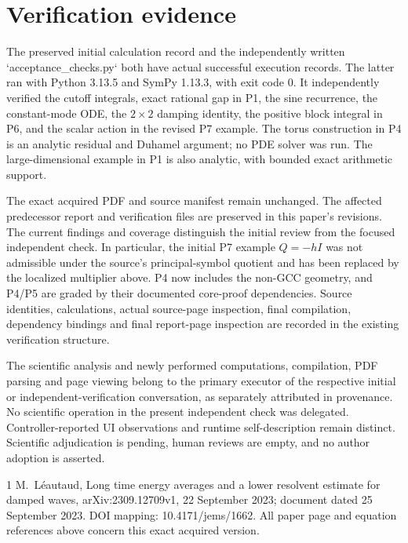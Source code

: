 \documentclass[10pt]{article}
\begin{document}
\section*{Verification evidence}
The preserved initial calculation record and the independently written `acceptance\_checks.py` both have actual successful execution records. The latter ran with Python 3.13.5 and SymPy 1.13.3, with exit code \(0\). It independently verified the cutoff integrals, exact rational gap in P1, the sine recurrence, the constant-mode ODE, the \(2\times2\) damping identity, the positive block integral in P6, and the scalar action in the revised P7 example. The torus construction in P4 is an analytic residual and Duhamel argument; no PDE solver was run. The large-dimensional example in P1 is also analytic, with bounded exact arithmetic support.\par
The exact acquired PDF and source manifest remain unchanged. The affected predecessor report and verification files are preserved in this paper’s revisions. The current findings and coverage distinguish the initial review from the focused independent check. In particular, the initial P7 example \(Q=-hI\) was not admissible under the source’s principal-symbol quotient and has been replaced by the localized multiplier above. P4 now includes the non-GCC geometry, and P4/P5 are graded by their documented core-proof dependencies. Source identities, calculations, actual source-page inspection, final compilation, dependency bindings and final report-page inspection are recorded in the existing verification structure.\par
The scientific analysis and newly performed computations, compilation, PDF parsing and page viewing belong to the primary executor of the respective initial or independent-verification conversation, as separately attributed in provenance. No scientific operation in the present independent check was delegated. Controller-reported UI observations and runtime self-description remain distinct. Scientific adjudication is pending, human reviews are empty, and no author adoption is asserted.\par
1 M. Léautaud, Long time energy averages and a lower resolvent estimate for damped waves, arXiv:2309.12709v1, 22 September 2023; document dated 25 September 2023. DOI mapping: 10.4171/jems/1662. All paper page and equation references above concern this exact acquired version.\par
\end{document}
